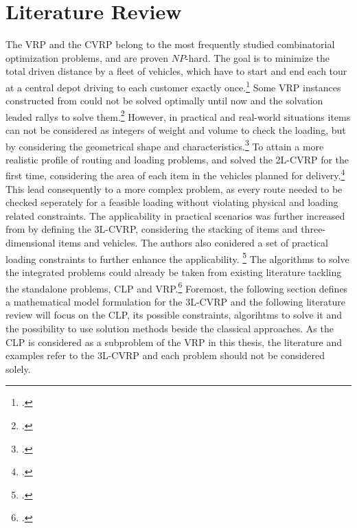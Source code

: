 \chapter{Literature Review}
\label{chap:literature_review}

The \gls{VRP} and the \gls{CVRP} belong to the most frequently studied combinatorial
optimization problems, and are proven $NP$-hard. The goal is to minimize the total driven distance
by a fleet of vehicles, which have to start and end each tour at a central depot driving to each
customer exactly once.\footcite[cf.][p. 1]{gendreau_tabu_2008} Some \gls{VRP}
instances constructed from \cite{solomon_algorithms_1987} could not be solved optimally until now and the
solvation leaded rallys to solve them.\footcite[cf.][]{solomon_algorithms_1987} However,
in practical and real-world situations items can not be considered as integers of weight
and volume to check the loading, but by considering the geometrical shape and characteristics.\footcite[cf.][p. 1]{gendreau_tabu_2008}
To attain a more realistic profile of routing and loading problems, \cite{iori_exact_2004} and \cite{gendreau_tabu_2008}
solved the \gls{2L-CVRP} for the first time, considering the area of each item in
the vehicles planned for delivery.\footcites(cf.)(){iori_exact_2004}{gendreau_tabu_2008}
This lead consequently to a more complex problem, as every route needed to be checked seperately for
a feasible loading without violating physical and loading related constraints.
The applicability in practical scenarios was further increased from \cite{gendreau_tabu_2006} by defining
the \gls{3L-CVRP}, considering the stacking of items and three-dimensional items and vehicles. The authors
also conidered a set of practical loading constraints to further enhance the applicability. \footcite[cf.][]{gendreau_tabu_2006}
The algorithms to solve the integrated problems could already be taken from existing literature tackling the standalone
problems, \gls{CLP} and \gls{VRP}.\footcite[cf.][]{pisinger_heuristics_2002} Foremost, the following section defines
a mathematical model formulation for the \gls{3L-CVRP} and the following literature review will focus
on the \gls{CLP}, its possible constraints, algorihtms to solve it and the possibility to use solution
methods beside the classical approaches. As the \gls{CLP} is considered as a subproblem of the \gls{VRP}
in this thesis, the literature and examples refer to the \gls{3L-CVRP} and each problem should not be
considered solely.



